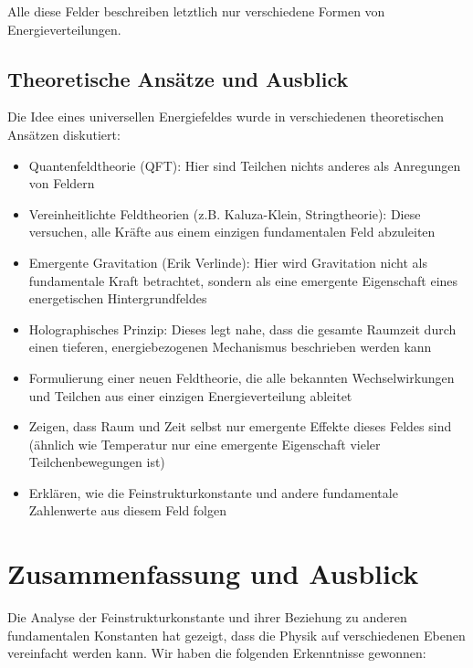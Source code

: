 \documentclass{article}
\begin{document}
	Alle diese Felder beschreiben letztlich nur verschiedene Formen von Energieverteilungen.
	
	\subsection{Theoretische Ansätze und Ausblick}
	
	Die Idee eines universellen Energiefeldes wurde in verschiedenen theoretischen Ansätzen diskutiert:
	
	\begin{itemize}
		\item Quantenfeldtheorie (QFT): Hier sind Teilchen nichts anderes als Anregungen von Feldern
		\item Vereinheitlichte Feldtheorien (z.B. Kaluza-Klein, Stringtheorie): Diese versuchen, alle Kräfte aus einem einzigen fundamentalen Feld abzuleiten
		\item Emergente Gravitation (Erik Verlinde): Hier wird Gravitation nicht als fundamentale Kraft betrachtet, sondern als eine emergente Eigenschaft eines energetischen Hintergrundfeldes
		\item Holographisches Prinzip: Dieses legt nahe, dass die gesamte Raumzeit durch einen tieferen, energiebezogenen Mechanismus beschrieben werden kann
	\end{itemize}
	
	\begin{itemize}
		\item Formulierung einer neuen Feldtheorie, die alle bekannten Wechselwirkungen und Teilchen aus einer einzigen Energieverteilung ableitet
		\item Zeigen, dass Raum und Zeit selbst nur emergente Effekte dieses Feldes sind (ähnlich wie Temperatur nur eine emergente Eigenschaft vieler Teilchenbewegungen ist)
		\item Erklären, wie die Feinstrukturkonstante und andere fundamentale Zahlenwerte aus diesem Feld folgen
	\end{itemize}
	
	\section{Zusammenfassung und Ausblick}
	
	Die Analyse der Feinstrukturkonstante und ihrer Beziehung zu anderen fundamentalen Konstanten hat gezeigt, dass die Physik auf verschiedenen Ebenen vereinfacht werden kann. Wir haben die folgenden Erkenntnisse gewonnen:
	
\end{document}
